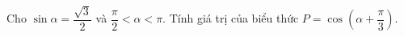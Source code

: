 \begin{ex}
Cho $\sin\alpha=\dfrac{\sqrt3}{2}$ và $\dfrac{\pi}{2}<\alpha<\pi$. Tính giá trị của biểu thức $P=\cos\left(\alpha+\dfrac{\pi}{3}\right)$.
\end{ex}
